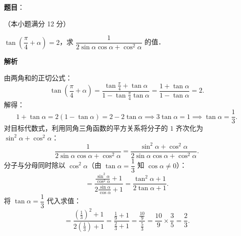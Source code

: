 \begin{answer}

\textbf{题目}：

（本小题满分 12 分）

$\tan\left(\dfrac{\pi}{4} + \alpha\right) = 2$，求 $\dfrac{1}{2\sin\alpha\cos\alpha + \cos^2\alpha}$ 的值．

\textbf{解析}

由两角和的正切公式：
\nopagebreak[4]
\[
\tan\left(\frac{\pi}{4} + \alpha\right) = \frac{\tan\frac{\pi}{4} + \tan\alpha}{1 - \tan\frac{\pi}{4}\tan\alpha} = \frac{1 + \tan\alpha}{1 - \tan\alpha} = 2.
\]
解得：
\nopagebreak[4]
\[
1 + \tan\alpha = 2(1 - \tan\alpha) = 2 - 2\tan\alpha \implies 3\tan\alpha = 1 \implies \tan\alpha = \frac{1}{3}.
\]
对目标代数式，利用同角三角函数的平方关系将分子的 $1$ 齐次化为 $\sin^2\alpha + \cos^2\alpha$：
\nopagebreak[4]
\[
\frac{1}{2\sin\alpha\cos\alpha + \cos^2\alpha} = \frac{\sin^2\alpha + \cos^2\alpha}{2\sin\alpha\cos\alpha + \cos^2\alpha}.
\]
分子与分母同时除以 $\cos^2\alpha$（由 $\tan\alpha = \dfrac{1}{3}$ 知 $\cos\alpha \neq 0$）：
\nopagebreak[4]
\[
= \frac{\frac{\sin^2\alpha}{\cos^2\alpha} + 1}{2\frac{\sin\alpha}{\cos\alpha} + 1} = \frac{\tan^2\alpha + 1}{2\tan\alpha + 1}.
\]
将 $\tan\alpha = \dfrac{1}{3}$ 代入求值：
\nopagebreak[4]
\[
= \frac{\left(\frac{1}{3}\right)^2 + 1}{2\left(\frac{1}{3}\right) + 1} = \frac{\frac{1}{9} + 1}{\frac{2}{3} + 1} = \frac{\frac{10}{9}}{\frac{5}{3}} = \frac{10}{9} \times \frac{3}{5} = \frac{2}{3}.
\]


\end{answer}
